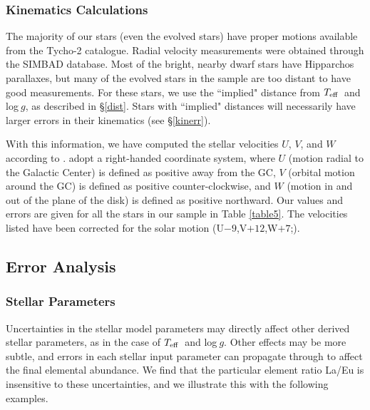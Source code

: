 \documentclass[12pt,preprint]{aastex}
\def\teff{\mbox{$T_{\rm {eff}}$}}
\begin{document}
\subsubsection{Kinematics Calculations}

The majority of our stars (even the evolved stars) have proper motions available from the Tycho-2 catalogue.  Radial velocity measurements were obtained through the SIMBAD database.  Most of the bright, nearby dwarf stars have Hipparchos parallaxes, but many of the evolved stars in the sample are too distant to have good measurements.  For these stars, we use the ``implied" distance from \teff~and log$~g$, as described in \S \ref{dist}.  Stars with ``implied" distances will necessarily have larger errors in their kinematics (see \S \ref{kinerr}).  

With this information, we have computed the stellar velocities $U$, $V$, and $W$ according to \citet{Johnson1987}.  \citet{Johnson1987} adopt a right-handed coordinate system, where $U$ (motion radial to the Galactic Center) is defined as positive away from the GC, $V$ (orbital motion around the GC) is defined as positive counter-clockwise, and $W$ (motion in and out of the plane of the disk) is defined as positive northward.  Our values and errors are given for all the stars in our sample in Table \ref{table5}.  The velocities listed have been corrected for the solar motion (U$-9$,V$+12$,W$+7$;\citealt{Mihalas1968}).

\subsection{Error Analysis \label{errors}}

\subsubsection{Stellar Parameters}

Uncertainties in the stellar model parameters may directly affect other derived stellar parameters,  as in the case of \teff~and log$~g$.  Other effects may be more subtle, and errors in each stellar input parameter can propagate through to affect the final elemental abundance.  We find that the particular element ratio La/Eu is insensitive to these uncertainties, and we illustrate this with the following examples.
\end{document}
